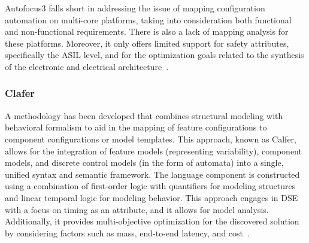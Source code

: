  
 
 Autofocus3 falls short in addressing the issue of mapping configuration automation on multi-core platforms, taking into consideration both functional and non-functional requirements. There is also a lack of mapping analysis for these platforms. Moreover, it only offers limited support for safety attributes, specifically the ASIL level, and for the optimization goals related to the synthesis of the electronic and electrical architecture~\cite{askaripoor2022architecture}.


 \subsubsection{Clafer} 
A methodology has been developed that combines structural modeling with behavioral formalism to aid in the mapping of feature configurations to component configurations or model templates. This approach, known as Calfer, allows for the integration of feature models (representing variability), component models, and discrete control models (in the form of automata) into a single, unified syntax and semantic framework.
The language component is constructed using a combination of first-order logic with quantifiers for modeling structures and linear temporal logic for modeling behavior. This approach engages in DSE with a focus on timing as an attribute, and it allows for model analysis. Additionally, it provides multi-objective optimization for the discovered solution by considering factors such as mass, end-to-end latency, and cost~\cite{juodisius2018clafer, ross2019synthesis}.

